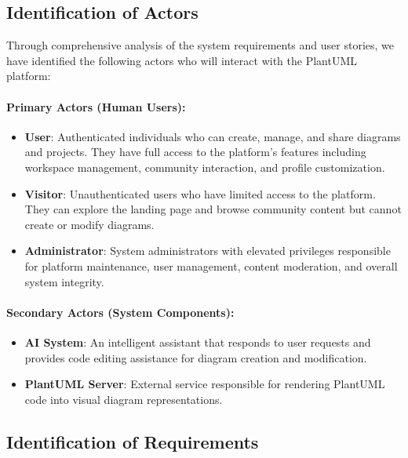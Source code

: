 \subsection{Identification of Actors}

Through comprehensive analysis of the system requirements and user stories, we have identified the following actors who will interact with the PlantUML platform:

\paragraph{Primary Actors (Human Users):}
\begin{itemize}
    \item \textbf{User}: Authenticated individuals who can create, manage, and share diagrams and projects. They have full access to the platform's features including workspace management, community interaction, and profile customization.
    
    \item \textbf{Visitor}: Unauthenticated users who have limited access to the platform. They can explore the landing page and browse community content but cannot create or modify diagrams.
    
    \item \textbf{Administrator}: System administrators with elevated privileges responsible for platform maintenance, user management, content moderation, and overall system integrity.
\end{itemize}

\paragraph{Secondary Actors (System Components):}
\begin{itemize}
    \item \textbf{AI System}: An intelligent assistant that responds to user requests and provides code editing assistance for diagram creation and modification.
    
    \item \textbf{PlantUML Server}: External service responsible for rendering PlantUML code into visual diagram representations.
\end{itemize}

\subsection{Identification of Requirements}

